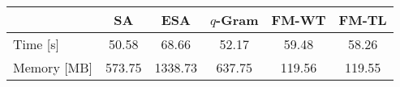     \begin{tabular}{lccccc}
    \toprule
    ~                       & SA 		& ESA 		& $q$-Gram		& FM-WT			&	FM-TL \\
    \midrule
    Time [s] 	            & 50.58		& 68.66		& 52.17			& 59.48			& 58.26      \\
    Memory [MB] 	        & 573.75	& 1338.73	& 637.75		& 119.56		& 119.55      \\
    \bottomrule
    \end{tabular}
